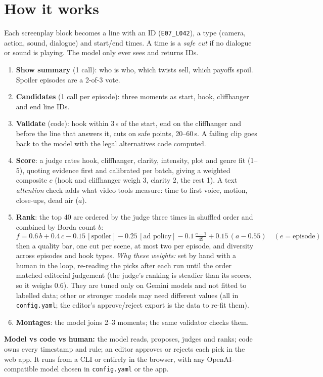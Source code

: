 \documentclass[10pt]{article}
\begin{document}
\section{How it works}
Each screenplay block becomes a line with an ID (\texttt{E07\_L042}), a type (camera, action, sound, dialogue) and
start/end times. A time is a \emph{safe cut} if no dialogue or sound is playing. The model only ever sees and returns IDs.
\begin{enumerate}
\item \textbf{Show summary} (1 call): who is who, which twists sell, which payoffs spoil. Spoiler episodes are a 2-of-3 vote.
\item \textbf{Candidates} (1 call per episode): three moments as start, hook, cliffhanger and end line IDs.
\item \textbf{Validate} (code): hook within 3\,s of the start, end on the cliffhanger and before the line that answers it,
cuts on safe points, 20--60\,s. A failing clip goes back to the model with the legal alternatives code computed.
\item \textbf{Score}: a judge rates hook, cliffhanger, clarity, intensity, plot and genre fit (1--5), quoting evidence
first and calibrated per batch, giving a weighted composite $c$ (hook and cliffhanger weigh 3, clarity 2, the rest 1).
A text \emph{attention} check adds what video tools measure: time to first voice, motion, close-ups, dead air ($a$).
\item \textbf{Rank}: the top 40 are ordered by the judge three times in shuffled order and combined by Borda count $b$:
\[ f = 0.6\,b + 0.4\,c - 0.15\,[\text{spoiler}] - 0.25\,[\text{ad policy}] - 0.1\,\tfrac{e-1}{49} + 0.15\,(a-0.55) \quad (e=\text{episode}) \]
then a quality bar, one cut per scene, at most two per episode, and diversity across episodes and hook types.
\emph{Why these weights:} set by hand with a human in the loop, re-reading the picks after each run until the order
matched editorial judgement (the judge's ranking is steadier than its scores, so it weighs 0.6). They are tuned only on
Gemini models and not fitted to labelled data; other or stronger models may need different values (all in
\texttt{config.yaml}; the editor's approve/reject export is the data to re-fit them).
\item \textbf{Montages}: the model joins 2--3 moments; the same validator checks them.
\end{enumerate}
\textbf{Model vs code vs human:} the model reads, proposes, judges and ranks; code owns every timestamp and rule; an
editor approves or rejects each pick in the web app. It runs from a CLI or entirely in the browser, with any
OpenAI-compatible model chosen in \texttt{config.yaml} or the app.
\end{document}
